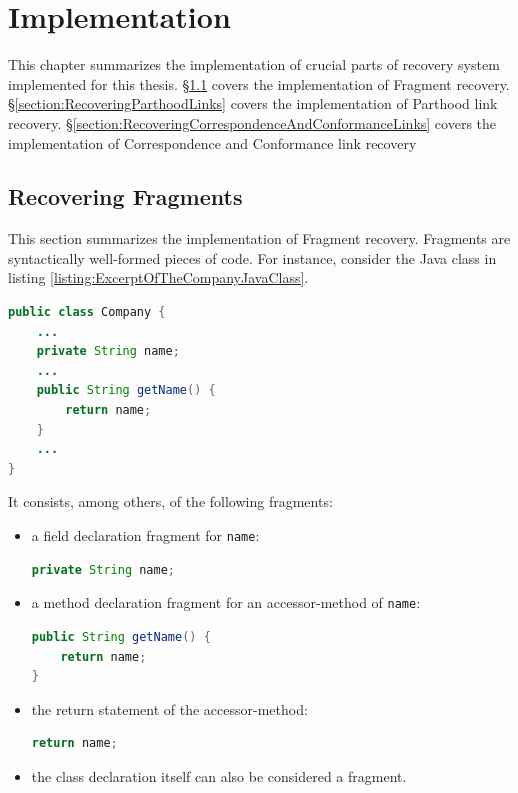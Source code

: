 \chapter{Implementation}
\label{chapter:Implementation}
This chapter summarizes the implementation of crucial parts of recovery system implemented for this thesis.
§\ref{section:RecoveringFragments} covers the implementation of \gls{Fragment} recovery.
§\ref{section:RecoveringParthoodLinks} covers the implementation of \gls{Parthood} link recovery.
§\ref{section:RecoveringCorrespondenceAndConformanceLinks} covers the implementation of \gls{Correspondence} and \gls{Conformance} link recovery

\section{Recovering Fragments}
\label{section:RecoveringFragments}
This section summarizes the implementation of \gls{Fragment} recovery.
\Glspl{Fragment} are syntactically well-formed pieces of code.
For instance, consider the \gls{Java} class in listing \ref{listing:ExcerptOfTheCompanyJavaClass}.
\begin{lstlisting}[language=Java,caption={Excerpt of the Company Java class},label={listing:ExcerptOfTheCompanyJavaClass}]
public class Company {
	...
	private String name;
	...
	public String getName() {
		return name;
	}
	...
}
\end{lstlisting}
It consists, among others, of the following fragments:
\begin{itemize}
\item
a field declaration fragment for \texttt{name}:
\begin{lstlisting}[language=Java,numbers=none,frame=no]
private String name;
\end{lstlisting}
\item
a method declaration fragment for an accessor-method of \texttt{name}:
\begin{lstlisting}[language=Java,numbers=none,frame=no]
public String getName() {
	return name;
}
\end{lstlisting}
\item
the return statement of the accessor-method:
\begin{lstlisting}[language=Java,numbers=none,frame=no]
return name;
\end{lstlisting}
\item
the class declaration itself can also be considered a fragment.
\end{itemize}

